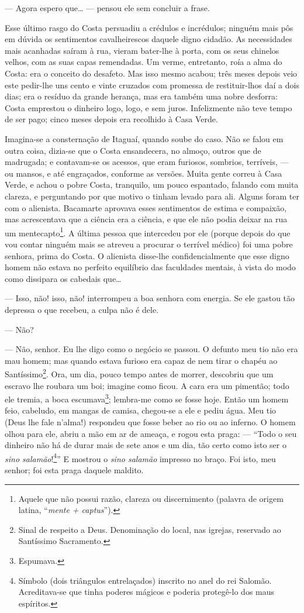 --- Agora espero que\ldots{} --- pensou ele sem concluir a frase.

Esse último rasgo do Costa persuadiu a crédulos e incrédulos; ninguém
mais pôs em dúvida os sentimentos cavalheirescos daquele digno cidadão.
As necessidades mais acanhadas saíram à rua, vieram bater-lhe à porta,
com os seus chinelos velhos, com as suas capas remendadas. Um verme,
entretanto, roía a alma do Costa: era o conceito do desafeto. Mas isso
mesmo acabou; três meses depois veio este pedir-lhe uns cento e vinte
cruzados com promessa de restituir-lhos daí a dois dias; era o resíduo
da grande herança, mas era também uma nobre desforra: Costa emprestou o
dinheiro logo, logo, e sem juros. Infelizmente não teve tempo de ser
pago; cinco meses depois era recolhido à Casa Verde.

Imagina-se a consternação de Itaguaí, quando soube do caso. Não se falou
em outra coisa, dizia-se que o Costa ensandecera, no almoço, outros que
de madrugada; e contavam-se os acessos, que eram furiosos, sombrios,
terríveis, --- ou mansos, e até engraçados, conforme as versões. Muita
gente correu à Casa Verde, e achou o pobre Costa, tranquilo, um pouco
espantado, falando com muita clareza, e perguntando por que motivo o
tinham levado para ali. Alguns foram ter com o alienista. Bacamarte
aprovava esses sentimentos de estima e compaixão, mas acrescentava que a
ciência era a ciência, e que ele não podia deixar na rua um
mentecapto\footnote{Aquele que não possui razão, clareza ou
  discernimento (palavra de origem latina, ``\emph{mente + captus}'').}.
A última pessoa que intercedeu por ele (porque depois do que vou contar
ninguém mais se atreveu a procurar o terrível médico) foi uma pobre
senhora, prima do Costa. O alienista disse-lhe confidencialmente que
esse digno homem não estava no perfeito equilíbrio das faculdades
mentais, à vista do modo como dissipara os cabedais que\ldots{}

--- Isso, não! isso, não! interrompeu a boa senhora com energia. Se ele
gastou tão depressa o que recebeu, a culpa não é dele.

--- Não?

--- Não, senhor. Eu lhe digo como o negócio se passou. O defunto meu tio
não era mau homem; mas quando estava furioso era capaz de nem tirar o
chapéu ao Santíssimo\footnote{Sinal de respeito a Deus. Denominação do
  local, nas igrejas, reservado ao Santíssimo Sacramento.}. Ora, um dia,
pouco tempo antes de morrer, descobriu que um escravo lhe roubara um
boi; imagine como ficou. A cara era um pimentão; todo ele tremia, a boca
escumava\footnote{Espumava.}; lembra-me como se fosse hoje. Então um
homem feio, cabeludo, em mangas de camisa, chegou-se a ele e pediu água.
Meu tio (Deus lhe fale n'alma!) respondeu que fosse beber ao rio ou ao
inferno. O homem olhou para ele, abriu a mão em ar de ameaça, e rogou
esta praga: --- ``Todo o seu dinheiro não há de durar mais de sete anos
e um dia, tão certo como isto ser o \emph{sino salamão}!\footnote{Símbolo
  (dois triângulos entrelaçados) inscrito no anel do rei Salomão.
  Acreditava-se que tinha poderes mágicos e poderia protegê-lo dos maus
  espíritos.}'' E mostrou o \emph{sino salamão} impresso no braço. Foi
isto, meu senhor; foi esta praga daquele maldito.

